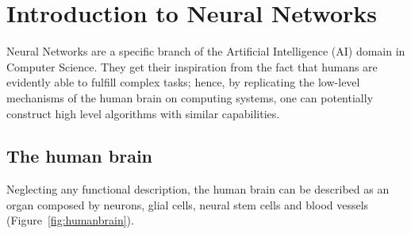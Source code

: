 \section{Introduction to Neural Networks}
Neural Networks are a specific branch of the Artificial Intelligence (AI) domain in Computer Science.
They get their inspiration from the fact that humans are evidently able to fulfill complex tasks; hence, by replicating the low-level mechanisms of the human brain on computing systems, one can potentially construct high level algorithms with similar capabilities.

\subsection{The human brain}
\label{subsect:brain}
Neglecting any functional description, the human brain can be described as an organ composed by neurons, glial cells, neural stem cells and blood vessels (Figure~\ref{fig:humanbrain}).

